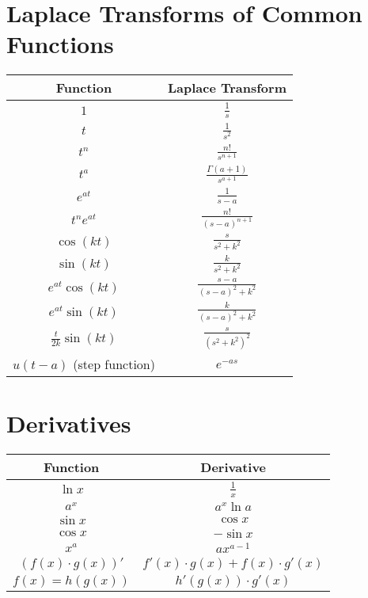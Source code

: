 \documentclass[a4paper,12pt]{article}
\begin{document}
\section*{Laplace Transforms of Common Functions}
\begin{tabular}{ |c|c| }
    \hline
    \textbf{Function} & \textbf{Laplace Transform} \\
    \hline
    $1$ & $\frac{1}{s}$ \\
    \hline
    $t$ & $\frac{1}{s^2}$ \\
    \hline
    $t^n$ & $\frac{n!}{s^{n+1}}$ \\
    \hline
    $t^a$ & $\frac{\Gamma(a+1)}{s^{a+1}}$ \\
    \hline
    $e^{at}$ & $\frac{1}{s-a}$ \\
    \hline
    $t^n e^{at}$ & $\frac{n!}{(s-a)^{n+1}}$ \\
    \hline
    $\cos(kt)$ & $\frac{s}{s^2 + k^2}$ \\
    \hline
    $\sin(kt)$ & $\frac{k}{s^2 + k^2}$ \\
    \hline
    $e^{at} \cos(kt)$ & $\frac{s-a}{(s-a)^2 + k^2}$ \\
    \hline
    $e^{at} \sin(kt)$ & $\frac{k}{(s-a)^2 + k^2}$ \\
    \hline
    $\frac{t}{2k} \sin(kt)$ & $\frac{s}{(s^2 + k^2)^2}$ \\
    \hline
    $u(t-a)$ (step function) & $e^{-as}$ \\
    \hline
\end{tabular}

\section*{Derivatives}
\renewcommand{\arraystretch}{1.8}
\begin{tabular}{ |c|c| }
    \hline
    \textbf{Function} & \textbf{Derivative} \\
    \hline
    $\ln x$ & $\frac{1}{x}$ \\
    \hline
    $a^x$ & $a^x \ln a$ \\
    \hline
    $\sin x$ & $\cos x$ \\
    \hline
    $\cos x$ & $-\sin x$ \\
    \hline
    $x^a$ & $a x^{a-1}$ \\
    \hline
    $(f(x) \cdot g(x))'$ & $f'(x) \cdot g(x) + f(x) \cdot g'(x)$ \\
    \hline
    $f(x) = h(g(x))$ & $h'(g(x)) \cdot g'(x)$ \\
    \hline
\end{tabular}
\end{document}
